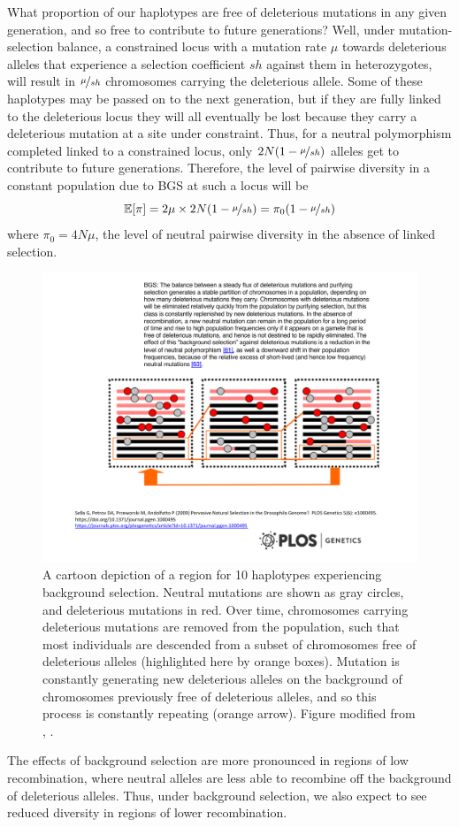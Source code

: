 What proportion of our haplotypes are free of
deleterious mutations in any given generation, and so free to
contribute to future generations? Well, under mutation-selection
balance, a constrained locus with a mutation rate $\mu$ towards
deleterious alleles that experience a selection coefficient $sh$
against them in heterozygotes, will result in $\nicefrac{\mu}{sh}$
chromosomes carrying the deleterious allele. Some of these haplotypes may be passed on to the next generation, but if they are fully linked to the deleterious locus they will all eventually be lost because they carry a deleterious mutation at a site under constraint. Thus, for a neutral polymorphism
completed linked to a constrained locus, only
$2N(1-\nicefrac{\mu}{sh})$ alleles get to contribute to future
generations. Therefore, the level of pairwise diversity in a constant
population due to BGS at such a locus will be
\begin{equation}
\mathbb{E}[\pi] = 2 \mu \times 2N(1-\nicefrac{\mu}{sh}) = \pi_0  (1-\nicefrac{\mu}{sh})
\end{equation}
where $\pi_0= 4N\mu$, the level of neutral pairwise diversity in the
absence of linked selection.

\begin{figure}
\begin{center}
\includegraphics[width=0.75 \textwidth]{figures/Hitchhiking/BGS_cartoon.pdf}
\end{center}
\caption{A cartoon depiction of a region for 10 haplotypes
  experiencing background selection. Neutral mutations are shown as
  gray circles, and deleterious mutations in red. Over time,
  chromosomes carrying deleterious mutations are removed from the
  population, such that most individuals are descended from a subset of
  chromosomes free of deleterious alleles (highlighted here by orange boxes). Mutation is constantly generating new deleterious alleles on
  the background of chromosomes previously free of deleterious
  alleles, and so this process is constantly repeating (orange arrow). Figure modified from \citet{sella2009pervasive}, \PLOSccBY.} \label{fig:BGS_cartoon}
\end{figure}
The effects of background selection are more pronounced in regions of low recombination, where
neutral alleles are less able to recombine off the background of deleterious
alleles. Thus, under background selection, we also expect to see
reduced diversity in regions of lower recombination. 

